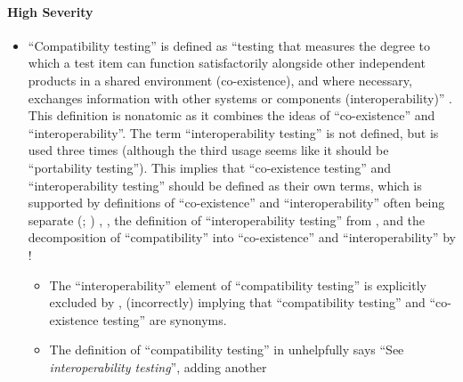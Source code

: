 \ifnotpaper\paragraph{High Severity}\fi
\begin{itemize}
      \item %
            ``Compatibility testing'' is defined as ``testing that measures the
            degree to which a test item can function satisfactorily alongside
            other independent products in a shared environment (co-existence),
            and where necessary, exchanges information with other systems or
            components (interoperability)'' \citep[p.~3]{IEEE2022}. This
            definition is nonatomic as it combines the ideas of ``co-existence''
            and ``interoperability''. The term ``interoperability testing'' is
            not defined, but is used three times \citep[pp.~22,~43]{IEEE2022}
            (although the third usage seems like it should be ``portability
            testing''). This implies that ``co-existence testing'' and
            ``interoperability testing'' should be defined as their own terms,
            which is supported by definitions of ``co-existence'' and
            ``interoperability'' often being separate
            \ifnotpaper
                  (\citealpISTQB{}; \citealp[pp.~73,~237]{IEEE2017})%
            \else
                  \cite[pp.~73,~237]{IEEE2017}, \cite{ISTQB}%
            \fi, the definition of
            ``interoperability testing'' from \citet[p.~238]{IEEE2017},
            and the decomposition of ``compatibility'' into ``co-existence''
            and ``interoperability'' by \citet{ISO_IEC2023a}!
            \begin{itemize}
                  \item %
                        The ``interoperability'' element of ``compatibility
                        testing'' is explicitly excluded by
                        \citet[p.~37]{IEEE2021}, (incorrectly) implying that
                        ``compatibility testing'' and ``co-existence testing''
                        are synonyms.
                  \item %
                        The definition of ``compatibility testing'' in
                        \citep[p.~43]{Kam2008} unhelpfully says ``See
                        \emph{interoperability testing}'', adding another

\end{itemize}
\end{itemize}
